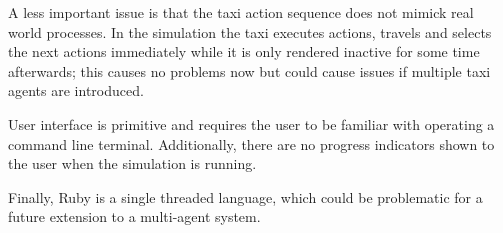 A less important issue is that the taxi action sequence does not mimick real
world processes. In the simulation the taxi executes actions, travels and
selects the next actions immediately while it is only rendered inactive for
some time afterwards; this causes no problems now but could cause issues if
multiple taxi agents are introduced.

User interface is primitive and requires the user to be familiar with operating
a command line terminal. Additionally, there are no progress indicators shown
to the user when the simulation is running.

Finally, Ruby is a single threaded language, which could be problematic for a
future extension to a multi-agent system.

